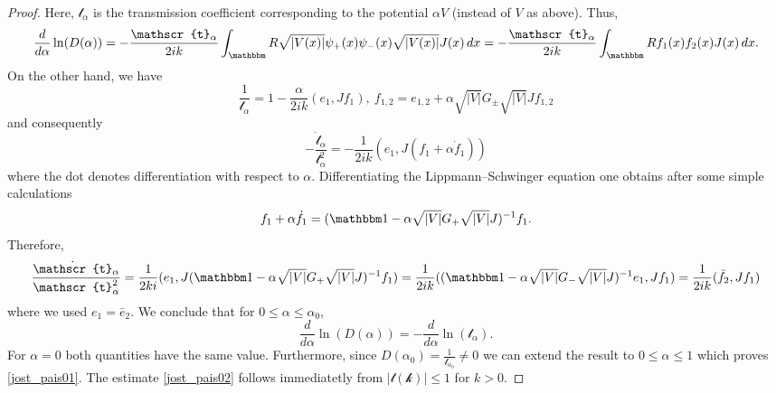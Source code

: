 \begin{proof}
Here, $\mathscr{t}_\alpha$ is the transmission coefficient corresponding to the potential $\alpha V$ (instead of $V$ as above). Thus,
\begin{equation*}
  \frac{d}{d\alpha} \ln(D(\alpha))
     = - \frac{\mathscr{t}_\alpha}{2ik} \int_\R \sqrt{|V(x)|}\psi_+(x)\psi_-(x)\sqrt{|V(x)|}J(x)\, dx
     = - \frac{\mathscr{t}_\alpha}{2ik} \int_\R f_1(x)f_2(x) J(x)\, dx .
\end{equation*}
On the other hand, we have
\begin{equation*}
  \frac{1}{\mathscr{t}_\alpha} = 1 - \frac{\alpha}{2ik} (e_1,Jf_1),\ f_{1,2} = e_{1,2} + \alpha\sqrt{|V|}G_\pm \sqrt{|V|}J f_{1,2}
\end{equation*}
and consequently
\begin{equation*}
  - \frac{\dot{\mathscr{t}}_\alpha}{\mathscr{t}_\alpha^2} = - \frac{1}{2ik}(e_1,J(f_1+\alpha\dot f_1))
\end{equation*}
where the dot denotes differentiation with respect to $\alpha$. Differentiating the Lippmann--Schwinger equation
one obtains after some simple calculations
\begin{equation*}
  f_1 + \alpha \dot f_1 = (\id - \alpha\sqrt{|V|}G_+ \sqrt{|V|}J)^{-1} f_1 .
\end{equation*}
Therefore,
\begin{equation*}
  \frac{\dot{\mathscr{t}}_\alpha}{\mathscr{t}_\alpha^2}
    = \frac{1}{2ki} ( e_1, J(\id-\alpha\sqrt{|V|}G_+\sqrt{|V|}J)^{-1}f_1)
    = \frac{1}{2ik} ((\id - \alpha\sqrt{|V|}G_-\sqrt{|V|}J)^{-1}e_1,J f_1)
    = \frac{1}{2ik} ( \bar f_2,Jf_1)
\end{equation*}
where we used $e_1 = \bar e_2$. We conclude that for $0\leq\alpha\leq \alpha_0$,
\begin{equation*}
  \frac{d}{d\alpha}\ln(D(\alpha)) = - \frac{d}{d\alpha}\ln(\mathscr{t}_\alpha) .
\end{equation*}
For $\alpha=0$ both quantities have the same value. Furthermore, since $D(\alpha_0)=\frac{1}{\mathscr{t}_{\alpha_0}}\neq 0$
we can extend the result to $0\leq\alpha\leq 1$ which proves \eqref{jost_pais01}.
The estimate \eqref{jost_pais02} follows immediatetly from $|\mathscr{t(k)}|\leq 1$ for $k>0$.
\end{proof}
